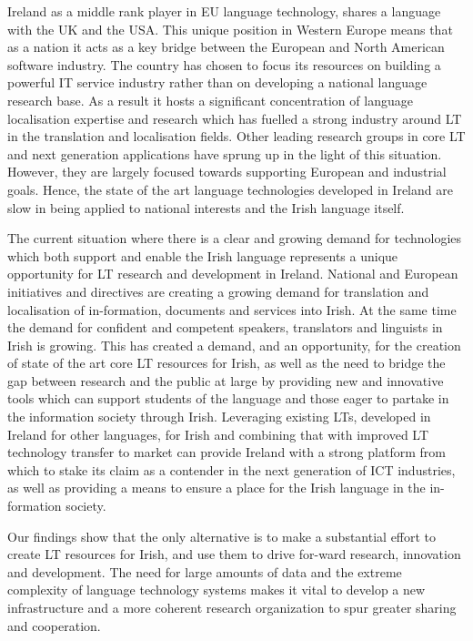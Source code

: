 \documentclass[]{../../metanetpaper}
\begin{document}
\begin{multicols}{2}
Ireland as a middle rank player in EU language technology, shares a language with the UK and the USA. This unique position in Western Europe means that as a nation it acts as a key bridge between the European and North American software industry. The country has chosen to focus its resources on building a powerful IT service industry rather than on developing a national language research base. As a result it hosts a significant concentration of language localisation expertise and research which has fuelled a strong industry around LT in the translation and localisation fields. Other leading research groups in core LT and next generation applications have sprung up in the light of this situation. However, they are largely focused towards supporting European and industrial goals. Hence, the state of the art language technologies developed in Ireland are slow in being applied to national interests and the Irish language itself.

The current situation where there is a clear and growing demand for technologies which both support and enable the Irish language represents a unique opportunity for LT research and development in Ireland. National and European initiatives and directives are creating a growing demand for translation and localisation of in-formation, documents and services into Irish. At the same time the demand for confident and competent speakers, translators and linguists in Irish is growing. This has created a demand, and an opportunity, for the creation of state of the art core LT resources for Irish, as well as the need to bridge the gap between research and the public at large by providing new and innovative tools which can support students of the language and those eager to partake in the information society through Irish. Leveraging existing LTs, developed in Ireland for other languages, for Irish and combining that with improved LT technology transfer to market can provide Ireland with a strong platform from which to stake its claim as a contender in the next generation of ICT industries, as well as providing a means to ensure a place for the Irish language in the in-formation society.

Our findings show that the only alternative is to make a substantial effort to create LT resources for Irish, and use them to drive for-ward research, innovation and development. The need for large amounts of data and the extreme complexity of language technology systems makes it vital to develop a new infrastructure and a more coherent research organization to spur greater sharing and cooperation.


\end{multicols}
\end{document}
